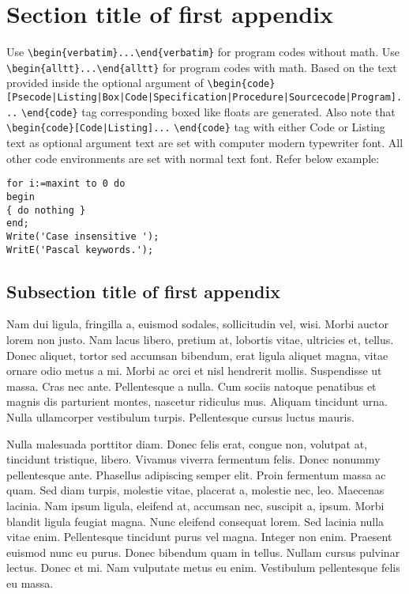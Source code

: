 \documentclass[AMA]{WileyNJD-v1}
\begin{document}
\section{Section title of first appendix\label{app1}}

Use \verb+\begin{verbatim}...\end{verbatim}+ for program codes without math. Use \verb+\begin{alltt}...\end{alltt}+ for program codes with math. Based on the text provided inside the optional argument of \verb+\begin{code}[Psecode|Listing|Box|Code|+\hfill\break \verb+Specification|Procedure|Sourcecode|Program]...+ \verb+\end{code}+ tag corresponding boxed like floats are generated. Also note that \verb+\begin{code}[Code|Listing]...+ \verb+\end{code}+ tag with either Code or Listing text as optional argument text are set with computer modern typewriter font.  All other code environments are set with normal text font. Refer below example:

\begin{lstlisting}[caption={Descriptive Caption Text},label=DescriptiveLabel]
for i:=maxint to 0 do
begin
{ do nothing }
end;
Write('Case insensitive ');
WritE('Pascal keywords.');
\end{lstlisting}



\subsection{Subsection title of first appendix\label{app1.1a}}

Nam dui ligula, fringilla a, euismod sodales, sollicitudin vel, wisi. Morbi auctor lorem non justo. Nam lacus libero,
pretium at, lobortis vitae, ultricies et, tellus. Donec aliquet, tortor sed accumsan bibendum, erat ligula aliquet magna,
vitae ornare odio metus a mi. Morbi ac orci et nisl hendrerit mollis. Suspendisse ut massa. Cras nec ante. Pellentesque
a nulla. Cum sociis natoque penatibus et magnis dis parturient montes, nascetur ridiculus mus. Aliquam tincidunt
urna. Nulla ullamcorper vestibulum turpis. Pellentesque cursus luctus mauris.

Nulla malesuada porttitor diam. Donec felis erat, congue non, volutpat at, tincidunt tristique, libero. Vivamus
viverra fermentum felis. Donec nonummy pellentesque ante. Phasellus adipiscing semper elit. Proin fermentum massa
ac quam. Sed diam turpis, molestie vitae, placerat a, molestie nec, leo. Maecenas lacinia. Nam ipsum ligula, eleifend
at, accumsan nec, suscipit a, ipsum. Morbi blandit ligula feugiat magna. Nunc eleifend consequat lorem. Sed lacinia
nulla vitae enim. Pellentesque tincidunt purus vel magna. Integer non enim. Praesent euismod nunc eu purus. Donec
bibendum quam in tellus. Nullam cursus pulvinar lectus. Donec et mi. Nam vulputate metus eu enim. Vestibulum
pellentesque felis eu massa.
\end{document}
